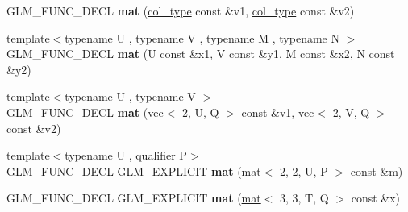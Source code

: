 \begin{DoxyCompactItemize}
\item 
\mbox{\label{structglm_1_1mat_3_012_00_012_00_01T_00_01Q_01_4_a92499177db639eceb49f41c6c41e0f99}} 
G\+L\+M\+\_\+\+F\+U\+N\+C\+\_\+\+D\+E\+CL {\bfseries mat} (\hyperlink{structglm_1_1vec_3_012_00_01T_00_01Q_01_4}{col\+\_\+type} const \&v1, \hyperlink{structglm_1_1vec_3_012_00_01T_00_01Q_01_4}{col\+\_\+type} const \&v2)
\item 
\mbox{\label{structglm_1_1mat_3_012_00_012_00_01T_00_01Q_01_4_a2da09d9a80d610da11c3b00c4ba8d0cf}} 
{\footnotesize template$<$typename U , typename V , typename M , typename N $>$ }\\G\+L\+M\+\_\+\+F\+U\+N\+C\+\_\+\+D\+E\+CL {\bfseries mat} (U const \&x1, V const \&y1, M const \&x2, N const \&y2)
\item 
\mbox{\label{structglm_1_1mat_3_012_00_012_00_01T_00_01Q_01_4_aa49f9fcb955b02cb48e6ac06f8332bcf}} 
{\footnotesize template$<$typename U , typename V $>$ }\\G\+L\+M\+\_\+\+F\+U\+N\+C\+\_\+\+D\+E\+CL {\bfseries mat} (\hyperlink{structglm_1_1vec}{vec}$<$ 2, U, Q $>$ const \&v1, \hyperlink{structglm_1_1vec}{vec}$<$ 2, V, Q $>$ const \&v2)
\item 
\mbox{\label{structglm_1_1mat_3_012_00_012_00_01T_00_01Q_01_4_a0e0673272ea7fa21ff9fed702d10c493}} 
{\footnotesize template$<$typename U , qualifier P$>$ }\\G\+L\+M\+\_\+\+F\+U\+N\+C\+\_\+\+D\+E\+CL G\+L\+M\+\_\+\+E\+X\+P\+L\+I\+C\+IT {\bfseries mat} (\hyperlink{structglm_1_1mat}{mat}$<$ 2, 2, U, P $>$ const \&m)
\item 
\mbox{\label{structglm_1_1mat_3_012_00_012_00_01T_00_01Q_01_4_a6f1117f5a62698b6ae7215893701d917}} 
G\+L\+M\+\_\+\+F\+U\+N\+C\+\_\+\+D\+E\+CL G\+L\+M\+\_\+\+E\+X\+P\+L\+I\+C\+IT {\bfseries mat} (\hyperlink{structglm_1_1mat}{mat}$<$ 3, 3, T, Q $>$ const \&x)
\item 
\mbox{\label{structglm_1_1mat_3_012_00_012_00_01T_00_01Q_01_4_aba87780d5e97d29189c692640171fd4a}} 

\end{DoxyCompactItemize}
